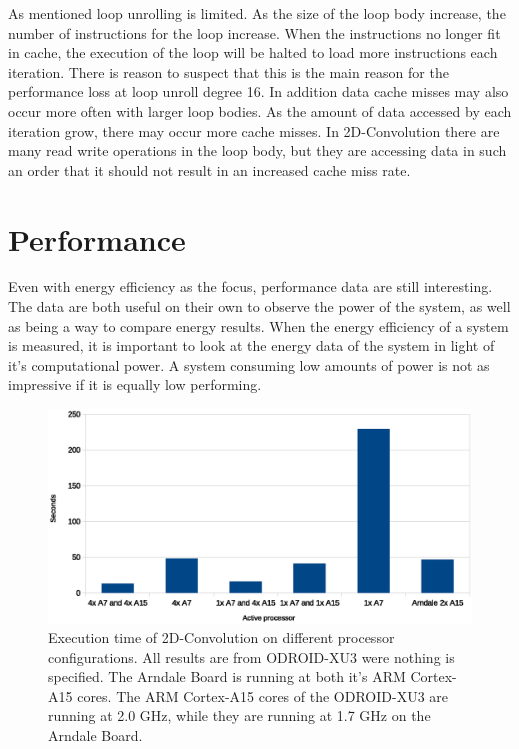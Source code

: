 As mentioned loop unrolling is limited.
As the size of the loop body increase, the number of instructions for the loop increase.
When the instructions no longer fit in cache, the execution of the loop will be halted to load more instructions each iteration.
There is reason to suspect that this is the main reason for the performance loss at loop unroll degree 16.
In addition data cache misses may also occur more often with larger loop bodies.
As the amount of data accessed by each iteration grow, there may occur more cache misses.
In 2D-Convolution there are many read write operations in the loop body, but they are accessing data in such an order that it should not result in an increased cache miss rate.

\section{Performance}
Even with energy efficiency as the focus, performance data are still interesting.
The data are both useful on their own to observe the power of the system, as well as being a way to compare energy results.
When the energy efficiency of a system is measured, it is important to look at the energy data of the system in light of it's computational power.
A system consuming low amounts of power is not as impressive if it is equally low performing.

\begin{figure}[H]
  \centering
  \includegraphics[width=160mm]{fig/execution-time-configurations.eps}
  \caption{Execution time of 2D-Convolution on different processor configurations. All results are from ODROID-XU3 were nothing is specified. The Arndale Board is running at both it's ARM Cortex-A15 cores. The ARM Cortex-A15 cores of the ODROID-XU3 are running at 2.0 GHz, while they are running at 1.7 GHz on the Arndale Board. \label{execution-time-configurations}}
\end{figure}

